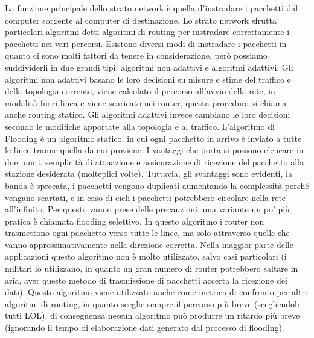 La funzione principale dello strato network è quella d’instradare i pacchetti dal computer sorgente al computer di destinazione.
Lo strato network sfrutta particolari algoritmi detti algoritmi di routing per instradare correttamente i pacchetti nei vari percorsi. Esistono diversi modi di instradare i pacchetti in quanto ci sono molti fattori da tenere in considerazione, però possiamo suddividerli in due grandi tipi: algoritmi non adattivi e algoritmi adattivi.
Gli algoritmi non adattivi basano le loro decisioni su misure e stime del traffico e della topologia corrente, viene calcolato il percorso all’avvio della rete, in modalità fuori linea e viene scaricato nei router, questa procedura si chiama anche routing statico. Gli algoritmi adattivi invece cambiano le loro decisioni secondo le modifiche apportate alla topologia e al traffico.
L’algoritmo di Flooding è un algoritmo statico, in cui ogni pacchetto in arrivo è inviato a tutte le linee tranne quella da cui proviene. I vantaggi che porta si possono elencare in due punti, semplicità di attuazione e assicurazione di ricezione del pacchetto alla stazione desiderata (molteplici volte).
Tuttavia, gli svantaggi sono evidenti, la banda è sprecata, i pacchetti vengono duplicati aumentando la complessità perché vengano scartati, e in caso di cicli i pacchetti potrebbero circolare nella rete all’infinito.
Per questo vanno prese delle precauzioni, una variante un po’ più pratica è chiamata flooding selettivo. In questo algoritmo i router non trasmettono ogni pacchetto verso tutte le linee, ma solo attraverso quelle che vanno approssimativamente nella direzione corretta.
Nella maggior parte delle applicazioni questo algoritmo non è molto utilizzato, salvo casi particolari (i militari lo utilizzano, in quanto un gran numero di router potrebbero saltare in aria, aver questo metodo di trasmissione di pacchetti accerta la ricezione dei dati).
Questo algoritmo viene utilizzato anche come metrica di confronto per altri algoritmi di routing, in quanto sceglie sempre il percorso più breve (scegliendoli tutti LOL), di conseguenza nessun algoritmo può produrre un ritardo più breve (ignorando il tempo di elaborazione dati generato dal processo di flooding).
 
